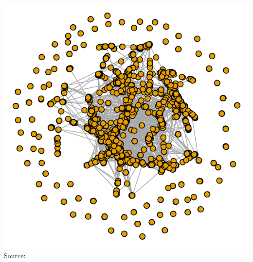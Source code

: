 \documentclass[8pt]{beamer}
\begin{document}
\begin{frame}[fragile]
\begin{columns}[c]
\begin{minipage}[c][.5\textheight][c]{\linewidth}
\centering
\includegraphics[width = \textwidth]{yeast_density}\\
\tiny Source: \cite{VonMering2002}
\end{minipage}

\end{columns}

\end{frame}
  

\end{document}
